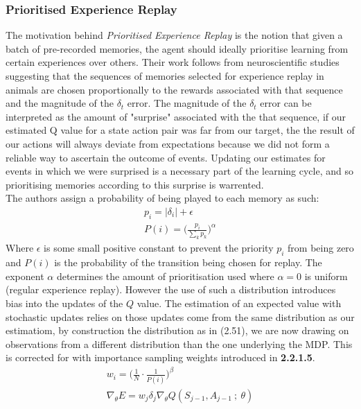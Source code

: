 \subsubsection{Prioritised Experience Replay}
The motivation behind \emph{Prioritised Experience Replay} \cite{Schaul2015} is the notion that given
a batch of pre-recorded memories, the agent should ideally prioritise learning 
from certain experiences over others. Their work follows from neuroscientific studies
suggesting that the sequences of memories selected for experience replay in animals
are chosen proportionally to the rewards associated with that sequence and the magnitude of the
$\delta_t$ error. The magnitude of the $\delta_t$ error can be interpreted as the amount of "surprise"
associated with the that sequence, if our estimated Q value for a state action pair was far
from our target, the the result of our actions will always deviate from expectations because we did not
form a reliable way to ascertain the outcome of events. Updating our estimates for events in which
we were surprised is a necessary part of the learning cycle, and so prioritising memories according
to this surprise is warrented.\\
The authors assign a probability of being played to each memory as such:
\begin{equation}
    \begin{gathered}
        p_i = \vert \delta_i \vert + \epsilon \\
        P(i) = \biggl(\frac{p_i}{\sum_k p_k}\biggl)^\alpha
    \end{gathered}
\end{equation}
Where $\epsilon$ is some small positive constant to prevent the priority $p_i$ from being zero
and $P(i)$ is the probability of the transition being chosen for replay. The exponent $\alpha$
determines the amount of prioritisation used where $\alpha = 0$ is uniform (regular experience replay).
However the use of such a distribution introduces bias into the updates of the $Q$ value. The estimation
of an expected value with stochastic updates relies on those updates come from the same distribution as
our estimatiom, by construction the distribution as in (2.51), we are now drawing on observations
from a different distribution than the one underlying the MDP. This is corrected for with 
importance sampling weights introduced in \textbf{2.2.1.5}.
\begin{equation}
    \begin{gathered}
        w_i = \biggl(\frac{1}{N}\cdot \frac{1}{P(i)} \biggl)^\beta \\
        \nabla_\theta E = w_j \delta_j \nabla_\theta Q(S_{j-1}, A_{j-1}\:; \: \theta)
    \end{gathered}
\end{equation}
